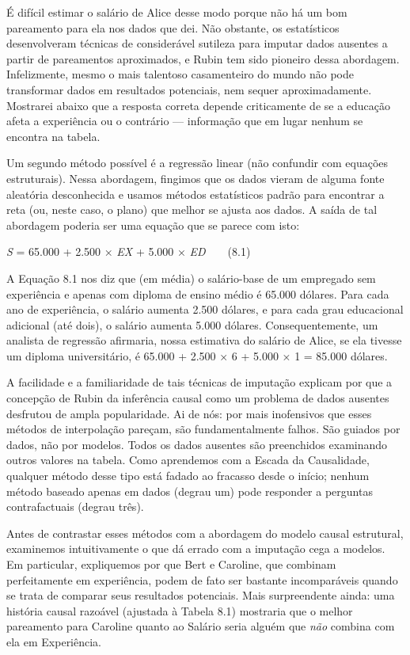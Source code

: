 \documentclass[11pt,a5paper,twoside]{book}
\begin{document}
É difícil estimar o salário de Alice desse modo porque não há um bom pareamento para ela nos dados que dei. Não obstante, os estatísticos desenvolveram técnicas de considerável sutileza para imputar dados ausentes a partir de pareamentos aproximados, e Rubin tem sido pioneiro dessa abordagem. Infelizmente, mesmo o mais talentoso casamenteiro do mundo não pode transformar dados em resultados potenciais, nem sequer aproximadamente. Mostrarei abaixo que a resposta correta depende criticamente de se a educação afeta a experiência ou o contrário — informação que em lugar nenhum se encontra na tabela.

Um segundo método possível é a regressão linear (não confundir com equações estruturais). Nessa abordagem, fingimos que os dados vieram de alguma fonte aleatória desconhecida e usamos métodos estatísticos padrão para encontrar a reta (ou, neste caso, o plano) que melhor se ajusta aos dados. A saída de tal abordagem poderia ser uma equação que se parece com isto:

\textit{S} = 65.000 + 2.500 × \textit{EX} + 5.000 × \textit{ED}  (8.1)

A Equação 8.1 nos diz que (em média) o salário-base de um empregado sem experiência e apenas com diploma de ensino médio é 65.000 dólares. Para cada ano de experiência, o salário aumenta 2.500 dólares, e para cada grau educacional adicional (até dois), o salário aumenta 5.000 dólares. Consequentemente, um analista de regressão afirmaria, nossa estimativa do salário de Alice, se ela tivesse um diploma universitário, é 65.000 + 2.500 × 6 + 5.000 × 1 = 85.000 dólares.

A facilidade e a familiaridade de tais técnicas de imputação explicam por que a concepção de Rubin da inferência causal como um problema de dados ausentes desfrutou de ampla popularidade. Ai de nós: por mais inofensivos que esses métodos de interpolação pareçam, são fundamentalmente falhos. São guiados por dados, não por modelos. Todos os dados ausentes são preenchidos examinando outros valores na tabela. Como aprendemos com a Escada da Causalidade, qualquer método desse tipo está fadado ao fracasso desde o início; nenhum método baseado apenas em dados (degrau um) pode responder a perguntas contrafactuais (degrau três).

Antes de contrastar esses métodos com a abordagem do modelo causal estrutural, examinemos intuitivamente o que dá errado com a imputação cega a modelos. Em particular, expliquemos por que Bert e Caroline, que combinam perfeitamente em experiência, podem de fato ser bastante incomparáveis quando se trata de comparar seus resultados potenciais. Mais surpreendente ainda: uma história causal razoável (ajustada à Tabela 8.1) mostraria que o melhor pareamento para Caroline quanto ao Salário seria alguém que \textit{não} combina com ela em Experiência.
\end{document}
